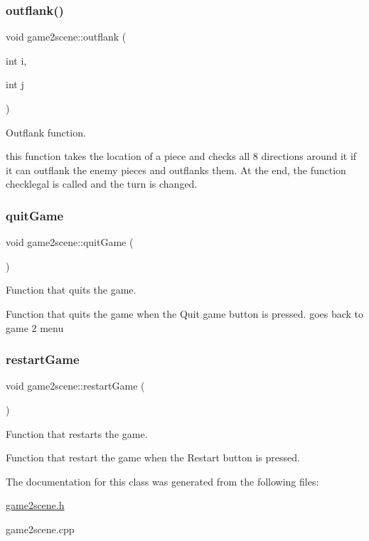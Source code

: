 \subsubsection{\texorpdfstring{outflank()}{outflank()}}
{\footnotesize\ttfamily void game2scene\+::outflank (\begin{DoxyParamCaption}\item[{int}]{i,  }\item[{int}]{j }\end{DoxyParamCaption})}



Outflank function. 

this function takes the location of a piece and checks all 8 directions around it if it can outflank the enemy pieces and outflanks them. At the end, the function checklegal is called and the turn is changed. \mbox{\label{classgame2scene_ab8f07d5d6dacd32de1ff442ee29f45d3}} 
\subsubsection{\texorpdfstring{quit\+Game}{quitGame}}
{\footnotesize\ttfamily void game2scene\+::quit\+Game (\begin{DoxyParamCaption}{ }\end{DoxyParamCaption})\hspace{0.3cm}{\ttfamily [slot]}}



Function that quits the game. 

Function that quits the game when the Quit game button is pressed. goes back to game 2 menu \mbox{\label{classgame2scene_a8b3ee51f004d034df994bd602a31ec5b}} 
\subsubsection{\texorpdfstring{restart\+Game}{restartGame}}
{\footnotesize\ttfamily void game2scene\+::restart\+Game (\begin{DoxyParamCaption}{ }\end{DoxyParamCaption})\hspace{0.3cm}{\ttfamily [slot]}}



Function that restarts the game. 

Function that restart the game when the Restart button is pressed. 

The documentation for this class was generated from the following files\+:\begin{DoxyCompactItemize}
\item 
\hyperlink{game2scene_8h}{game2scene.\+h}\item 
game2scene.\+cpp\end{DoxyCompactItemize}
